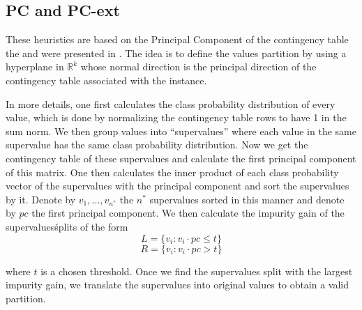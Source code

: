 %
%
\subsection{PC and PC-ext}
These heuristics are based on the Principal Component of the contingency table the and were presented in \cite{journals/datamine/CoppersmithHH99}. The idea is to define the values partition by using  a hyperplane in $\mathbb{R}^k$ whose normal  direction is the principal direction of the 
contingency table associated with the instance.

In more details, one first calculates the class probability distribution of every value, which is done by normalizing the contingency table rows to have 1 in the sum norm. We then group values into ``supervalues'' where each value in the same supervalue has the same class probability distribution. Now we get the contingency table of these supervalues and calculate the first principal component of this matrix. One then calculates the inner product of each class probability vector of the supervalues  with the principal component and sort the supervalues by it. Denote by $v_1,\ldots,v_{n^*}$ the $n^*$ supervalues sorted in this manner and denote by $pc$ the first principal component. We then calculate the impurity gain of the supervalues\' splits of the form
$$L = \{v_i : v_i \cdot pc \leq t\}$$
$$R = \{v_i : v_i \cdot pc > t\}$$

where $t$ is a chosen threshold. Once we find the supervalues split with the largest impurity gain, we translate the supervalues into original values to obtain a valid partition.

